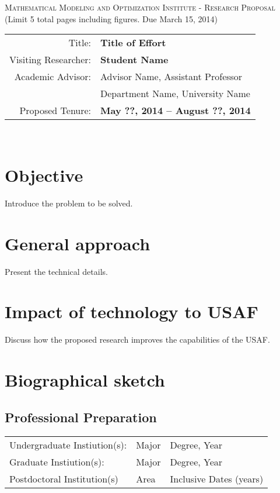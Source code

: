 \documentclass{article}
\begin{document}
\begin{center}
\textsc{Mathematical Modeling and Optimization Institute - Research Proposal}\\ \textnormal{(Limit 5 total pages including figures.  Due March 15, 2014)}
\bigskip\\
\end{center}


\begin{tabular}{rl}
Title: & \textbf{Title of Effort}\\
Visiting Researcher: & \textbf{Student Name}\\
Academic Advisor: & Advisor Name, Assistant Professor\\
                  & Department Name, University Name\\
Proposed Tenure:& \textbf{May ??, 2014 -- August ??, 2014}\\
\end{tabular}
\bigskip\\

	
\section{Objective}
Introduce the problem to be solved.\\

\section{General approach}
Present the technical details.\\

\section{Impact of technology to USAF}
Discuss how the proposed research improves the capabilities of the USAF.\\


\section{Biographical sketch}
\subsection{Professional Preparation}
\begin{tabular}{lll}
Undergraduate Instiution(s): & Major & Degree, Year\\
Graduate Instiution(s): & Major & Degree, Year\\
Postdoctoral Institution(s)& Area & Inclusive Dates (years) \\
\end{tabular}\\
\end{document}
